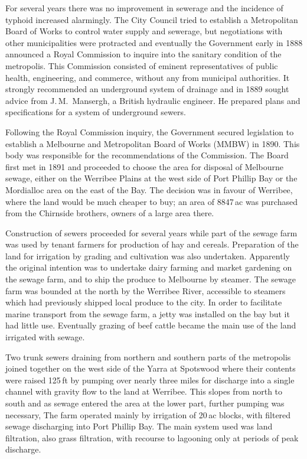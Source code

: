 For several years there was no improvement in sewerage and the
incidence of typhoid increased alarmingly.  The City Council tried to
establish a Metropolitan Board of Works to control water supply and
sewerage, but negotiations with other municipalities were protracted
and eventually the Government early in 1888 announced a Royal
Commission to inquire into the sanitary condition of the metro\-po\-lis.
This Commission consisted of eminent representatives of public health,
engineering, and commerce, without any from municipal authorities.  It
strongly recommended an underground system of drainage and in 1889
sought advice from J.\,M.~Mansergh, a British hydraulic engineer.  He
prepared plans and specifications for a system of underground
sewers.

Following the Royal Commission inquiry, the Government secured
legislation to establish a Melbourne and Metropolitan Board of Works
(MMBW) in 1890.  This body was responsible for the recommendations of
the Commission.  The Board first met in 1891 and proceeded to choose
the area for disposal of Melbourne sewage, either on the Werribee
Plains at the west side of Port Phillip Bay or the Mordialloc area on
the east of the Bay.  The decision was in favour of Werribee, where
the land would be much cheaper to buy; an area of 8847\,ac was
purchased from the Chirnside brothers, owners of a large area
there.

Construction of sewers proceeded for several years while part of the
sewage farm was used by tenant farmers for production of hay and
cereals.  Preparation of the land for irrigation by grading and
cultivation was also undertaken.  Apparently the original intention
was to undertake dairy farming and market gardening on the sewage
farm, and to ship the produce to Melbourne by steamer. The sewage farm
was bounded at the north by the Werribee River, accessible to steamers
which had previously shipped local produce to the city.  In order to
facilitate marine transport from the sewage farm, a jetty was
installed on the bay but it had little use.  Eventually grazing of
beef cattle became the main use of the land irrigated with
sewage.

Two trunk sewers draining from northern and southern parts of the
metro\-po\-lis joined together on the west side of the Yarra at Spotswood
where their contents were raised 125\,ft by pumping over nearly three
miles for discharge into a single channel with gravity flow to the
land at Werribee.  This slopes from north to south and as sewage
entered the area at the lower part, further pumping was necessary, The
farm operated mainly by irrigation of 20\,ac blocks, with filtered
sewage discharging into Port Phillip Bay.  The main system used was
land filtration, also grass filtration, with recourse to lagooning
only at periods of peak discharge.

